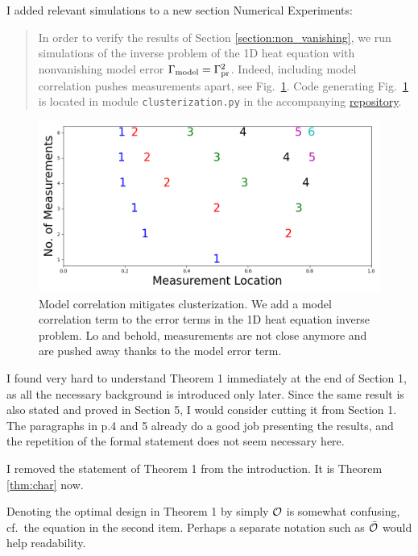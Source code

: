 \AR I added relevant simulations to a new section Numerical
Experiments:


\begin{quote}
  In order to verify the results of Section
  \ref{section:non_vanishing}, we run simulations of the inverse
  problem of the 1D heat equation with nonvanishing model error
  \(\Gamma_{\textup{model}} = \Gamma_{\textup{pr}}^2 \). Indeed, including model correlation pushes
  measurements apart, see Fig.~\ref{fig:corr_errors}. Code generating
  Fig.~\ref{fig:corr_errors} is located in module
  \texttt{clusterization.py} in the accompanying
  \href{https://github.com/yairdaon/OED}{repository}.
\end{quote}
\begin{figure}
  \centering
  \includegraphics[height=0.5\textwidth]{../latex/figs/dst_modelError4.png}
  \caption{Model correlation mitigates clusterization. We add a
    model correlation term to the error terms in the 1D heat
    equation inverse problem. Lo and behold, measurements are not
    close anymore and are pushed away thanks to the model error
    term.}
    \label{fig:corr_errors}
\end{figure}

  
\RC I found very hard to understand Theorem 1 immediately at the end
of Section 1, as all the necessary background is introduced only
later. Since the same result is also stated and proved in Section 5, I
would consider cutting it from Section 1. The paragraphs in p.4 and 5
already do a good job presenting the results, and the repetition of
the formal statement does not seem necessary here.

\AR I removed the statement of Theorem 1 from the introduction. It is
Theorem \ref{thm:char} now.


\RC Denoting the optimal design in Theorem 1 by simply $\mathcal{O}$ is
somewhat confusing, cf.~the equation in the second item. Perhaps a
separate notation such as $\bar{\mathcal{O}}$ would help readability.

